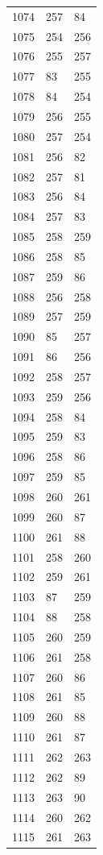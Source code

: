 \documentclass[a4paper,11pt]{article}
\begin{document}
\begin{center}
\begin{longtable}{|R{1.5cm}|R{1.5cm}|R{1.5cm}|}
 1074 &  257 &   84 \\
 1075 &  254 &  256 \\
 1076 &  255 &  257 \\
 1077 &   83 &  255 \\
 1078 &   84 &  254 \\
 1079 &  256 &  255 \\
 1080 &  257 &  254 \\
 1081 &  256 &   82 \\
 1082 &  257 &   81 \\
 1083 &  256 &   84 \\
 1084 &  257 &   83 \\
 1085 &  258 &  259 \\
 1086 &  258 &   85 \\
 1087 &  259 &   86 \\
 1088 &  256 &  258 \\
 1089 &  257 &  259 \\
 1090 &   85 &  257 \\
 1091 &   86 &  256 \\
 1092 &  258 &  257 \\
 1093 &  259 &  256 \\
 1094 &  258 &   84 \\
 1095 &  259 &   83 \\
 1096 &  258 &   86 \\
 1097 &  259 &   85 \\
 1098 &  260 &  261 \\
 1099 &  260 &   87 \\
 1100 &  261 &   88 \\
 1101 &  258 &  260 \\
 1102 &  259 &  261 \\
 1103 &   87 &  259 \\
 1104 &   88 &  258 \\
 1105 &  260 &  259 \\
 1106 &  261 &  258 \\
 1107 &  260 &   86 \\
 1108 &  261 &   85 \\
 1109 &  260 &   88 \\
 1110 &  261 &   87 \\
 1111 &  262 &  263 \\
 1112 &  262 &   89 \\
 1113 &  263 &   90 \\
 1114 &  260 &  262 \\
 1115 &  261 &  263 \\

\end{longtable}
\end{center}
\end{document}
